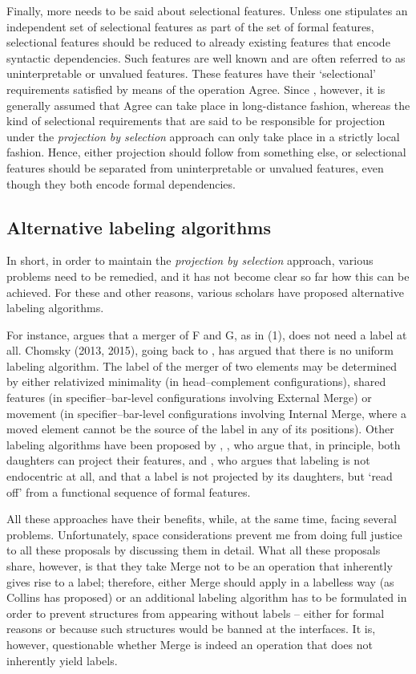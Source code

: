 \documentclass[output=paper
,modfonts
,nonflat]{langsci/langscibook}
\begin{document}
Finally, more needs to be said about selectional features. Unless one stipulates an independent set of selectional features as part of the set of formal features, selectional features should be reduced to already existing features that encode syntactic dependencies. Such features are well known and are often referred to as uninterpretable or unvalued features. These features have their ‘selectional’ requirements satisfied by means of the operation Agree. Since \citet{Chomsky2001}, however, it is generally assumed that Agree can take place in long-distance fashion, whereas the kind of selectional requirements that are said to be responsible for projection under the \textit{projection by selection} approach can only take place in a strictly local fashion. Hence, either projection should follow from something else, or selectional features should be separated from uninterpretable or unvalued features, even though they both encode formal dependencies.

\subsection{Alternative labeling algorithms}
In short, in order to maintain the \textit{projection by selection} approach, various problems need to be remedied, and it has not become clear so far how this can be achieved. For these and other reasons, various scholars have proposed alternative labeling algorithms.

For instance, \citet{Collins2002} argues that a merger of F and G, as in (1), does not need a label at all. Chomsky (2013, 2015), going back to \citet{Chomsky2008}, has argued that there is no uniform labeling algorithm. The label of the merger of two elements may be determined by either relativized minimality (in head–complement configurations), shared features (in specifier–bar-level configurations involving External Merge) or movement (in specifier–bar-level configurations involving Internal Merge, where a moved element cannot be the source of the label in any of its positions). Other labeling algorithms have been proposed by \citet{Cecchetto_Donati2010}, \citet{Cecchetto_Donati2015}, who argue that, in principle, both daughters can project their features, and \citet{Adger2013}, who argues that labeling is not endocentric at all, and that a label is not projected by its daughters, but ‘read off’ from a functional sequence of formal features.

All these approaches have their benefits, while, at the same time, facing several problems. Unfortunately, space considerations prevent me from doing full justice to all these proposals by discussing them in detail. What all these proposals share, however, is that they take Merge not to be an operation that inherently gives rise to a label; therefore, either Merge should apply in a labelless way (as Collins has proposed) or an additional labeling algorithm has to be formulated in order to prevent structures from appearing without labels – either for formal reasons or because such structures would be banned at the interfaces. It is, however, questionable whether Merge is indeed an operation that does not inherently yield labels.
\end{document}
